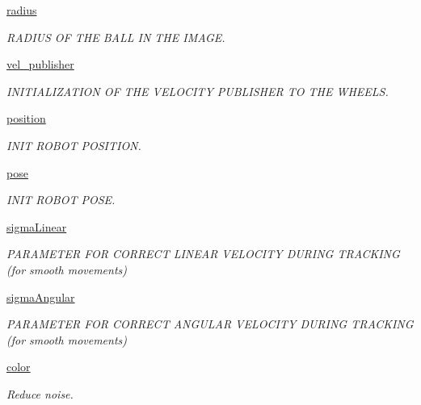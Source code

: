 \begin{DoxyCompactItemize}
\hyperlink{classtrackingBall_1_1Tracking_a9216a69022a6756b653d59834bb46de3}{radius}
\begin{DoxyCompactList}\small\item\em R\+A\+D\+I\+US OF T\+HE B\+A\+LL IN T\+HE I\+M\+A\+GE. \end{DoxyCompactList}\item 
\hyperlink{classtrackingBall_1_1Tracking_aec612c6502c0a334f67d8b32e7b77b62}{vel\+\_\+publisher}
\begin{DoxyCompactList}\small\item\em I\+N\+I\+T\+I\+A\+L\+I\+Z\+A\+T\+I\+ON OF T\+HE V\+E\+L\+O\+C\+I\+TY P\+U\+B\+L\+I\+S\+H\+ER TO T\+HE W\+H\+E\+E\+LS. \end{DoxyCompactList}\item 
\hyperlink{classtrackingBall_1_1Tracking_a8698f440e6e3e4b1b785cab162794b61}{position}
\begin{DoxyCompactList}\small\item\em I\+N\+IT R\+O\+B\+OT P\+O\+S\+I\+T\+I\+ON. \end{DoxyCompactList}\item 
\hyperlink{classtrackingBall_1_1Tracking_af3d46e4a3b61c4cc2841cfdd6e02c459}{pose}
\begin{DoxyCompactList}\small\item\em I\+N\+IT R\+O\+B\+OT P\+O\+SE. \end{DoxyCompactList}\item 
\hyperlink{classtrackingBall_1_1Tracking_a684292f4752cf04f4aeb3baf84e0b155}{sigma\+Linear}
\begin{DoxyCompactList}\small\item\em P\+A\+R\+A\+M\+E\+T\+ER F\+OR C\+O\+R\+R\+E\+CT L\+I\+N\+E\+AR V\+E\+L\+O\+C\+I\+TY D\+U\+R\+I\+NG T\+R\+A\+C\+K\+I\+NG (for smooth movements) \end{DoxyCompactList}\item 
\hyperlink{classtrackingBall_1_1Tracking_abcf19d205ec149c4f87a2c3b43fa242e}{sigma\+Angular}
\begin{DoxyCompactList}\small\item\em P\+A\+R\+A\+M\+E\+T\+ER F\+OR C\+O\+R\+R\+E\+CT A\+N\+G\+U\+L\+AR V\+E\+L\+O\+C\+I\+TY D\+U\+R\+I\+NG T\+R\+A\+C\+K\+I\+NG (for smooth movements) \end{DoxyCompactList}\item 
\hyperlink{classtrackingBall_1_1Tracking_aa5264f9fd30dcb6818c64175c9aa9a88}{color}
\begin{DoxyCompactList}\small\item\em Reduce noise. \end{DoxyCompactList}\end{DoxyCompactItemize}


